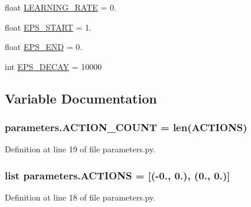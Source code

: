 \begin{DoxyCompactItemize}
\item 
float \hyperlink{namespaceparameters_afb996d542e8c3d3e8bbdfe4a711694dd}{L\+E\+A\+R\+N\+I\+N\+G\+\_\+\+R\+A\+TE} = 0.
\item 
float \hyperlink{namespaceparameters_a371d0de003e9046dcc72450b7512ce14}{E\+P\+S\+\_\+\+S\+T\+A\+RT} = 1.
\item 
float \hyperlink{namespaceparameters_a3765f189d3af4815766ded3bffcba1e2}{E\+P\+S\+\_\+\+E\+ND} = 0.
\item 
int \hyperlink{namespaceparameters_ab9a88c663385563b35331bbea5c4a74b}{E\+P\+S\+\_\+\+D\+E\+C\+AY} = 10000
\end{DoxyCompactItemize}


\subsection{Variable Documentation}
\subsubsection[{\texorpdfstring{A\+C\+T\+I\+O\+N\+\_\+\+C\+O\+U\+NT}{ACTION_COUNT}}]{\setlength{\rightskip}{0pt plus 5cm}parameters.\+A\+C\+T\+I\+O\+N\+\_\+\+C\+O\+U\+NT = len({\bf A\+C\+T\+I\+O\+NS})}\hypertarget{namespaceparameters_ae4be13f6dac91f471da3efb4618a54c1}{}\label{namespaceparameters_ae4be13f6dac91f471da3efb4618a54c1}


Definition at line 19 of file parameters.\+py.

\subsubsection[{\texorpdfstring{A\+C\+T\+I\+O\+NS}{ACTIONS}}]{\setlength{\rightskip}{0pt plus 5cm}list parameters.\+A\+C\+T\+I\+O\+NS = \mbox{[}(-\/0., 0.), (0., 0.)\mbox{]}}\hypertarget{namespaceparameters_a585a25d0a26bcab4242d2e3fb1c1f93e}{}\label{namespaceparameters_a585a25d0a26bcab4242d2e3fb1c1f93e}


Definition at line 18 of file parameters.\+py.

